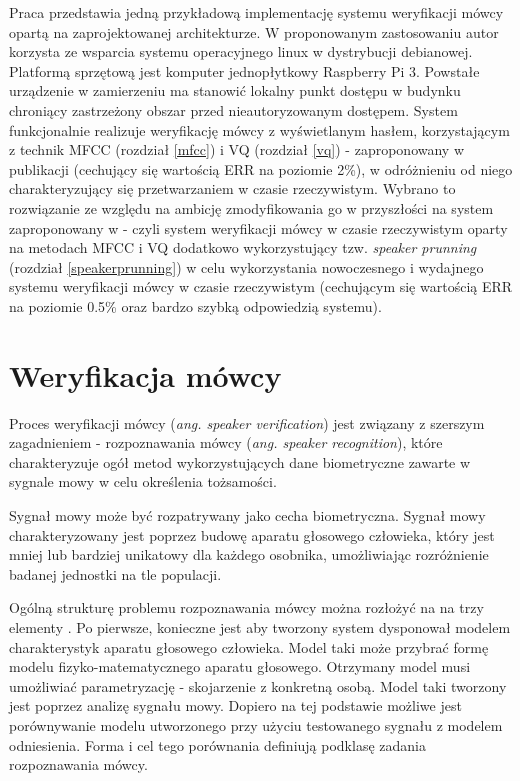 Praca przedstawia jedną przykładową implementację systemu weryfikacji mówcy opartą na zaprojektowanej architekturze. W proponowanym zastosowaniu autor korzysta ze wsparcia systemu operacyjnego linux w dystrybucji debianowej. Platformą sprzętową jest komputer jednopłytkowy Raspberry Pi 3. Powstałe urządzenie w zamierzeniu ma stanowić lokalny punkt dostępu w budynku chroniący zastrzeżony obszar przed nieautoryzowanym dostępem. System funkcjonalnie realizuje weryfikację mówcy z wyświetlanym hasłem,
korzystającym z technik MFCC (rozdział \ref{mfcc}) i VQ (rozdział \ref{vq}) - zaproponowany w publikacji \cite{10digits92} (cechujący się wartością ERR na poziomie 2\%), w odróżnieniu od niego charakteryzujący się przetwarzaniem w czasie rzeczywistym. Wybrano to rozwiązanie ze względu na ambicję zmodyfikowania go w przyszłości na system zaproponowany w \cite{finprunning} - czyli system weryfikacji mówcy w czasie rzeczywistym oparty na metodach MFCC i VQ dodatkowo wykorzystujący tzw.
\textit{speaker prunning} (rozdział \ref{speakerprunning}) w celu wykorzystania nowoczesnego i wydajnego systemu weryfikacji mówcy w czasie rzeczywistym (cechującym się wartością ERR na poziomie 0.5\% oraz bardzo szybką odpowiedzią systemu).

\section{Weryfikacja mówcy}
\label{verification}

Proces weryfikacji mówcy (\textit{ang. speaker verification}) jest związany z szerszym zagadnieniem - rozpoznawania mówcy (\textit{ang. speaker recognition}), które charakteryzuje ogół metod wykorzystujących dane biometryczne zawarte w sygnale mowy w celu określenia tożsamości.

Sygnał mowy może być rozpatrywany jako cecha biometryczna. Sygnał mowy charakteryzowany jest poprzez budowę aparatu głosowego człowieka, który jest mniej lub bardziej unikatowy dla każdego osobnika, umożliwiając rozróżnienie badanej jednostki na tle populacji.

Ogólną strukturę problemu rozpoznawania mówcy można rozłożyć na na trzy elementy \cite{fosr}. Po pierwsze, konieczne jest aby tworzony system dysponował modelem charakterystyk aparatu głosowego człowieka. Model taki może przybrać formę modelu fizyko-matematycznego aparatu głosowego. Otrzymany model musi umożliwiać parametryzację - skojarzenie z konkretną osobą. Model taki tworzony jest poprzez analizę sygnału mowy. Dopiero na tej podstawie możliwe jest porównywanie modelu utworzonego przy użyciu testowanego sygnału z modelem odniesienia. Forma i cel tego porównania definiują podklasę zadania rozpoznawania mówcy.


